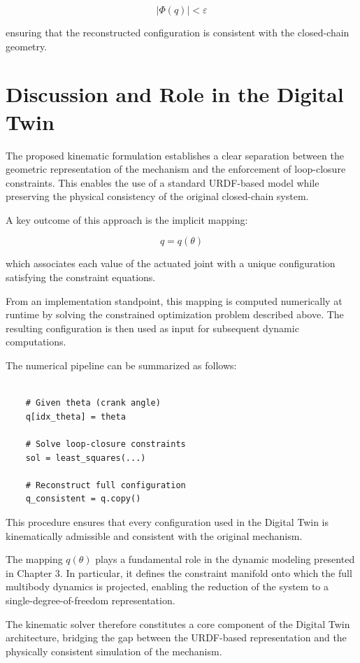 \begin{equation}
    |\Phi(q)| < \varepsilon
\end{equation}


ensuring that the reconstructed configuration is consistent with the closed-chain geometry.



\section{Discussion and Role in the Digital Twin}
The proposed kinematic formulation establishes a clear separation between the geometric representation of the mechanism and the enforcement of loop-closure constraints. This enables the use of a standard URDF-based model while preserving the physical consistency of the original closed-chain system.

A key outcome of this approach is the implicit mapping:

\begin{equation}
    q = q(\theta)
\end{equation}

which associates each value of the actuated joint with a unique configuration satisfying the constraint equations.

From an implementation standpoint, this mapping is computed numerically at runtime by solving the constrained optimization problem described above. The resulting configuration is then used as input for subsequent dynamic computations.

The numerical pipeline can be summarized as follows:

\begin{verbatim}

    # Given theta (crank angle)
    q[idx_theta] = theta

    # Solve loop-closure constraints
    sol = least_squares(...)

    # Reconstruct full configuration
    q_consistent = q.copy()

\end{verbatim}

This procedure ensures that every configuration used in the Digital Twin is kinematically admissible and consistent with the original mechanism.

The mapping $q(\theta)$ plays a fundamental role in the dynamic modeling presented in Chapter 3. In particular, it defines the constraint manifold onto which the full multibody dynamics is projected, enabling the reduction of the system to a single-degree-of-freedom representation.

The kinematic solver therefore constitutes a core component of the Digital Twin architecture, bridging the gap between the URDF-based representation and the physically consistent simulation of the mechanism.
